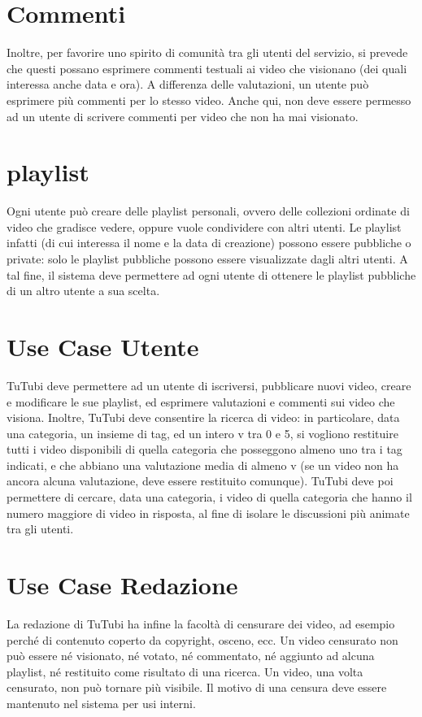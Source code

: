 \documentclass{article}
\begin{document}
    \section{Commenti}
    Inoltre, per favorire uno spirito di comunità tra gli utenti del servizio, si prevede che
    questi possano esprimere commenti testuali ai video che visionano (dei quali interessa
    anche data e ora). A differenza delle valutazioni, un utente può esprimere più commenti
    per lo stesso video. Anche qui, non deve essere permesso ad un utente di scrivere
    commenti per video che non ha mai visionato.
    \section{playlist}
    Ogni utente può creare delle playlist personali, ovvero delle collezioni ordinate di
    video che gradisce vedere, oppure vuole condividere con altri utenti. Le playlist infatti
    (di cui interessa il nome e la data di creazione) possono essere pubbliche o private: solo
    le playlist pubbliche possono essere visualizzate dagli altri utenti. A tal fine, il sistema
    deve permettere ad ogni utente di ottenere le playlist pubbliche di un altro utente a sua
    scelta.
    \section{Use Case Utente}
    TuTubi deve permettere ad un utente di iscriversi, pubblicare nuovi video, creare e
    modificare le sue playlist, ed esprimere valutazioni e commenti sui video che visiona.
    Inoltre, TuTubi deve consentire la ricerca di video: in particolare, data una categoria,
    un insieme di tag, ed un intero v tra 0 e 5, si vogliono restituire tutti i video disponibili
    di quella categoria che posseggono almeno uno tra i tag indicati, e che abbiano una
    valutazione media di almeno v (se un video non ha ancora alcuna valutazione, deve
    essere restituito comunque). TuTubi deve poi permettere di cercare, data una categoria,
    i video di quella categoria che hanno il numero maggiore di video in risposta, al fine di
    isolare le discussioni più animate tra gli utenti.
    \section{Use Case Redazione}
    La redazione di TuTubi ha infine la facoltà di censurare dei video, ad esempio perché
    di contenuto coperto da copyright, osceno, ecc. Un video censurato non può essere né
    visionato, né votato, né commentato, né aggiunto ad alcuna playlist, né restituito come
    risultato di una ricerca. Un video, una volta censurato, non può tornare più visibile. Il
    motivo di una censura deve essere mantenuto nel sistema per usi interni.
\end{document}
